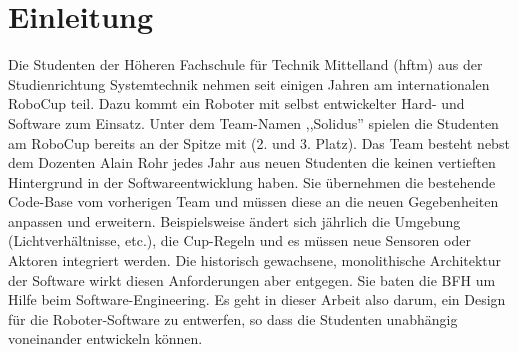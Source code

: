 \chapter{Einleitung}
Die Studenten der Höheren Fachschule für Technik Mittelland (\acrshort{hftm}) aus der Studienrichtung Systemtechnik nehmen seit einigen Jahren am internationalen RoboCup teil. Dazu kommt ein Roboter mit selbst entwickelter Hard- und Software zum Einsatz. Unter dem Team-Namen ,,Solidus'' spielen die Studenten am RoboCup bereits an der Spitze mit (2. und 3. Platz). Das Team besteht nebst dem Dozenten Alain Rohr jedes Jahr aus neuen Studenten die keinen vertieften Hintergrund in der Softwareentwicklung haben. Sie übernehmen die bestehende Code-Base vom vorherigen Team und müssen diese an die neuen Gegebenheiten anpassen und erweitern. Beispielsweise ändert sich jährlich die Umgebung (Lichtverhältnisse, etc.), die Cup-Regeln und es müssen neue Sensoren oder Aktoren integriert werden. Die historisch gewachsene, monolithische Architektur der Software wirkt diesen Anforderungen aber entgegen.
Sie baten die BFH um Hilfe beim Software-Engineering. Es geht in dieser Arbeit also darum, ein Design für die Roboter-Software zu entwerfen, so dass die Studenten unabhängig voneinander entwickeln können.
